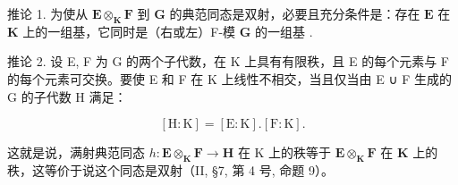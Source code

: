 推论 1. 为使从 \(\mathbf{E} \otimes_{\mathbf{K}} \mathbf{F}\) 到 \(\mathbf{G}\) 的典范同态是双射，必要且充分条件是：存在 \(\mathbf{E}\) 在 \(\mathbf{K}\) 上的一组基，它同时是（右或左）F-模 \(\mathbf{G}\) 的一组基 .

推论 2. 设 E, F 为 G 的两个子代数，在 K 上具有有限秩，且 E 的每个元素与 F 的每个元素可交换。要使 E 和 F 在 K 上线性不相交，当且仅当由 E ∪ F 生成的 G 的子代数 H 满足：

\[
[ \mathrm{H}: \mathrm{K} ] = [ \mathrm{E}: \mathrm{K} ]. [ \mathrm{F}: \mathrm{K} ].\tag{12}
\]

这就是说，满射典范同态 \(h: \mathbf{E} \otimes_{\mathbf{K}} \mathbf{F} \to \mathbf{H}\) 在 K 上的秩等于 \(\mathbf{E} \otimes_{\mathbf{K}} \mathbf{F}\) 在 \(\mathbf{K}\) 上的秩，这等价于说这个同态是双射（II, §7, 第 4 号, 命题 9）。

